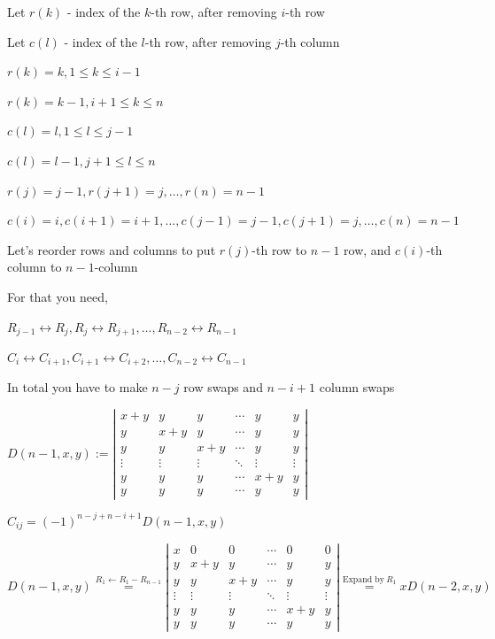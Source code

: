 \documentclass{article}
\begin{document}
Let \( r(k) \) - index of the \( k \)-th row, after removing \( i \)-th row

Let \( c(l) \) - index of the \( l \)-th row, after removing \( j \)-th column

\( r(k) = k, 1 \leq k \leq i - 1 \)

\( r(k) = k - 1, i + 1 \leq k \leq n \)

\( c(l) = l, 1 \leq l \leq j - 1 \)

\( c(l) = l - 1, j + 1 \leq l \leq n \)

\( r(j) = j - 1, r(j+1) = j, \ldots, r(n) = n - 1 \)

\( c(i) = i, c(i+1) = i + 1, \ldots, c(j-1) = j - 1, c(j+1) = j, \ldots, c(n) = n - 1 \)

Let's reorder rows and columns to put \( r(j) \)-th row to \( n-1 \) row, and \( c(i) \)-th column to \( n-1 \)-column

For that you need,

\( R_{j-1} \leftrightarrow R_{j}, R_{j} \leftrightarrow R_{j+1}, \ldots, R_{n-2} \leftrightarrow R_{n-1} \)

\( C_{i} \leftrightarrow C_{i+1}, C_{i+1} \leftrightarrow C_{i+2}, \ldots, C_{n-2} \leftrightarrow C_{n-1} \)

In total you have to make \( n-j \) row swaps and \( n-i+1 \) column swaps

\( D(n-1,x,y) := \left|\begin{matrix}x + y & y & y & \cdots & y & y \\ y & x + y & y & \cdots & y & y \\ y & y & x + y & \cdots & y & y \\ \vdots & \vdots & \vdots & \ddots & \vdots & \vdots \\ y & y & y & \cdots & x+y & y \\ y & y & y & \cdots & y & y \end{matrix}\right| \)

\( \hat{C}_{ij} = (-1)^{n-j+n-i+1} D(n-1, x, y) \)

\( D(n-1,x,y) \overset{R_1 \leftarrow R_1 - R_{n-1}}{=} \left|\begin{matrix}x  & 0 & 0 & \cdots & 0 & 0 \\ y & x + y & y & \cdots & y & y \\ y & y & x + y & \cdots & y & y \\ \vdots & \vdots & \vdots & \ddots & \vdots & \vdots \\ y & y & y & \cdots & x+y & y \\ y & y & y & \cdots & y & y \end{matrix}\right| \overset{\text{Expand by}\ R_1}{=} xD(n-2,x,y) \)
\end{document}
